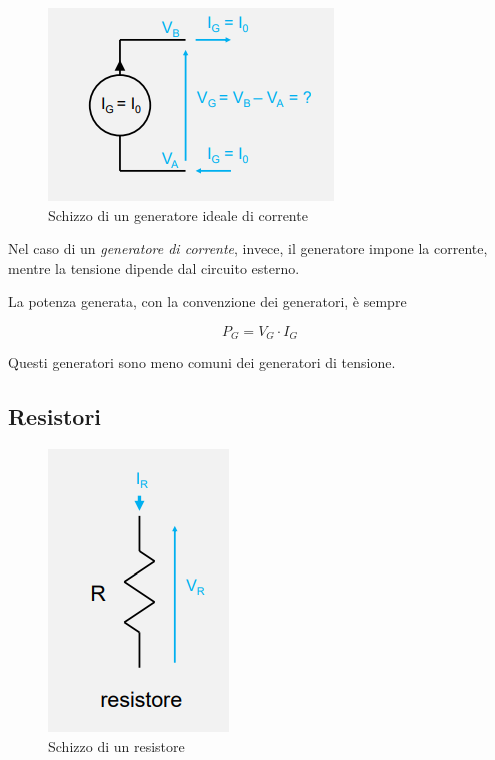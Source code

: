\documentclass{article}
\begin{document}
\begin{figure}[h]
  \centering
  \includegraphics[scale=0.6]{IM_generatori_corrente}
  \caption{Schizzo di un generatore ideale di corrente}
  \label{Schema_generatori_corrente}
\end{figure}

Nel caso di un \textit{generatore di corrente}, invece, il generatore impone la corrente, mentre la tensione dipende dal circuito esterno.

La potenza generata, con la convenzione dei generatori, è sempre 

\[P_G = V_G \cdot I_G\]

Questi generatori sono meno comuni dei generatori di tensione.

\clearpage






\subsection{Resistori}

\begin{figure}[h]
  \centering
  \includegraphics[scale=0.7]{IM_resistore}
  \caption{Schizzo di un resistore}
  \label{Schema_resistore}
\end{figure}
\end{document}
